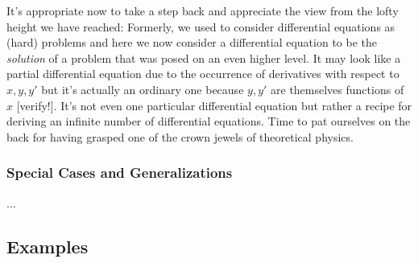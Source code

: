 \medskip
It's appropriate now to take a step back and appreciate the view from the lofty height we have reached:  Formerly, we used to consider differential equations as (hard) problems and here we now consider a differential equation to be the \emph{solution} of a problem that was posed on an even higher level. It may look like a partial differential equation due to the occurrence of derivatives with respect to $x,y,y'$ but it's actually an ordinary one because $y,y'$ are themselves functions of $x$ [verify!]. It's not even one particular differential equation but rather a recipe for deriving an infinite number of differential equations. Time to pat ourselves on the back for having grasped one of the crown jewels of theoretical physics. 


\subsubsection{Special Cases and Generalizations}
...







\subsection{Examples}






